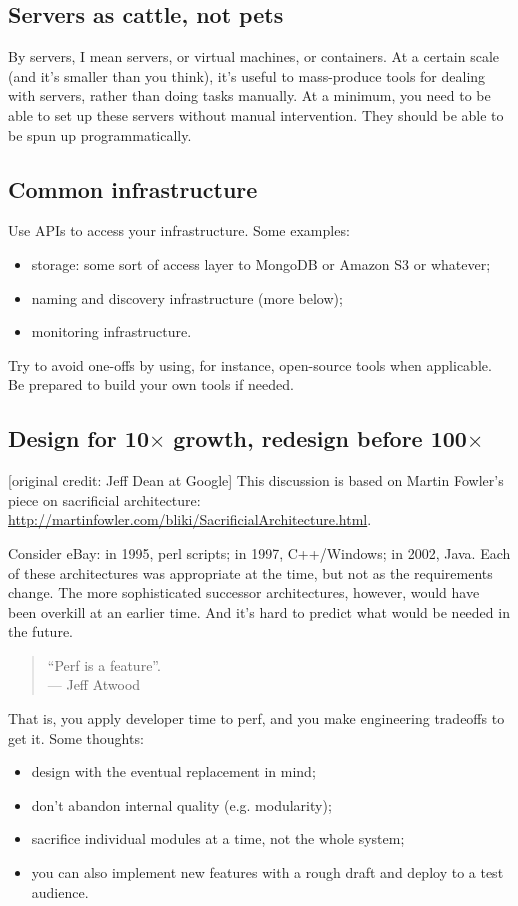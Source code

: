 \documentclass[11pt]{article}
\newenvironment{itemizep}{
 \begin{itemize}
  \setlength{\itemsep}{0pt}
  \setlength{\parsep}{3pt}
  \setlength{\topsep}{3pt}
  \setlength{\partopsep}{0pt}
  \setlength{\leftmargin}{1.5em}
  \setlength{\labelwidth}{1em}
  \setlength{\labelsep}{0.5em} }
 {\end{itemize}}
\begin{document}
\subsection*{Servers as cattle, not pets}
By servers, I mean servers, or virtual machines, or containers.
At a certain scale (and it's smaller than you think), it's useful to
mass-produce tools for dealing with servers, rather than doing tasks
manually. At a minimum, you need to be able to set up these servers
without manual intervention. They should be able to be spun up 
programmatically.

\subsection*{Common infrastructure}
Use APIs to access your infrastructure. Some examples:
\begin{itemizep}
\item storage: some sort of access layer to MongoDB or Amazon S3 or whatever;
\item naming and discovery infrastructure (more below);
\item monitoring infrastructure.
\end{itemizep}
Try to avoid one-offs by using, for instance, open-source tools when applicable.
Be prepared to build your own tools if needed.

\subsection*{Design for 10$\times$ growth, redesign before 100$\times$}
[original credit: Jeff Dean at Google] This discussion is based on
Martin Fowler's piece on sacrificial architecture:
\url{http://martinfowler.com/bliki/SacrificialArchitecture.html}.

Consider eBay: in 1995, perl scripts; in 1997, C++/Windows; in 2002,
Java.  Each of these architectures was appropriate at the time, but
not as the requirements change. The more sophisticated successor
architectures, however, would have been overkill at an earlier
time. And it's hard to predict what would be needed in the future.

\begin{quote}
``Perf is a feature''.\\
\hfill --- Jeff Atwood
\end{quote}
That is, you apply developer time to perf, and you make engineering tradeoffs
to get it. Some thoughts:
\begin{itemizep}
\item design with the eventual replacement in mind;
\item don't abandon internal quality (e.g. modularity);
\item sacrifice individual modules at a time, not the whole system;
\item you can also implement new features with a rough draft and deploy to a test audience.
\end{itemizep}
\end{document}

